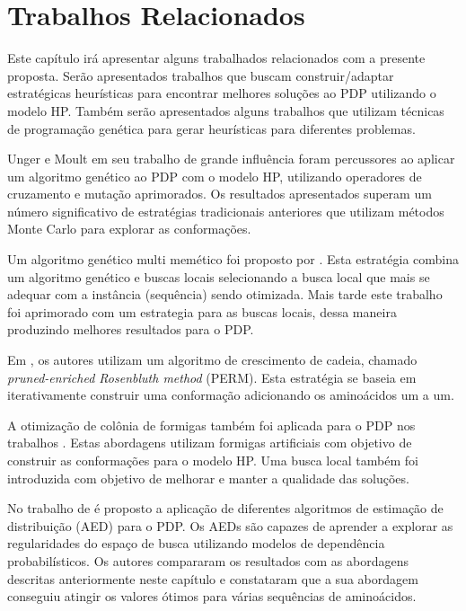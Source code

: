 \chapter{Trabalhos Relacionados}
\label{cap:Trabalhos Relacionados}

Este capítulo irá apresentar alguns trabalhados relacionados com a presente proposta. Serão apresentados trabalhos que buscam construir/adaptar estratégicas heurísticas para encontrar melhores soluções ao PDP utilizando o modelo HP. Também serão apresentados alguns trabalhos que utilizam técnicas de programação genética para gerar heurísticas para diferentes problemas.



Unger e Moult em seu trabalho de grande influência \cite{unger1993genetic} foram percussores ao aplicar um algoritmo genético ao PDP com o modelo HP, utilizando operadores de cruzamento e mutação aprimorados. Os resultados apresentados superam um número significativo de estratégias tradicionais anteriores que utilizam métodos Monte Carlo para explorar as conformações. 

Um algoritmo genético multi memético foi proposto por \cite{krasnogor2002multimeme}. Esta estratégia combina um algoritmo genético e buscas locais selecionando a busca local que mais se adequar com a instância (sequência) sendo otimizada. Mais tarde este trabalho foi aprimorado com um estrategia  para as buscas locais, dessa maneira produzindo melhores resultados para o PDP.

Em \cite{hsu2003growth}, os autores utilizam um algoritmo de crescimento de cadeia, chamado \textit{pruned-enriched Rosenbluth method} (PERM). Esta estratégia se baseia em iterativamente construir uma conformação adicionando os aminoácidos um a um. 

A otimização de colônia de formigas também foi aplicada para o PDP nos trabalhos \cite{shmygelska2002ant,shmygelska2003improved}. Estas abordagens utilizam formigas artificiais com objetivo de construir as conformações para o modelo HP. Uma busca local também foi introduzida com objetivo de melhorar e manter a qualidade das soluções. 

No trabalho de \cite{santanna2008} é proposto a aplicação de diferentes algoritmos de estimação de distribuição (AED) para o PDP. Os AEDs são capazes de aprender a explorar as regularidades do espaço de busca utilizando modelos de dependência probabilísticos. Os autores compararam os resultados com as abordagens descritas anteriormente neste capítulo e constataram que a sua abordagem conseguiu atingir os valores ótimos para várias sequências de aminoácidos.


